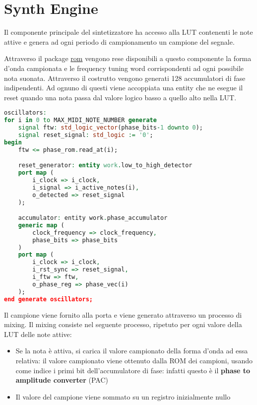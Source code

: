\section{Synth Engine}
\label{sec:synthengine}

\begin{center}
\end{center}


Il componente principale del sintetizzatore ha accesso alla LUT contenenti le note attive e genera ad ogni periodo di campionamento
un campione del segnale.

Attraverso il package \hyperref[sec:rom]{rom} vengono rese disponibili a questo componente la forma d'onda campionata e le frequency
tuning word corrispondenti ad ogni possibile nota suonata.
Attraverso il costrutto  vengono generati 128 accumulatori di fase indipendenti. Ad ognuno di questi viene accoppiata
una entity che ne esegue il reset quando una nota passa dal valore logico basso a quello alto nella LUT.
\begin{lstlisting}[language=VHDL]
oscillators:
for i in 0 to MAX_MIDI_NOTE_NUMBER generate
    signal ftw: std_logic_vector(phase_bits-1 downto 0);
    signal reset_signal: std_logic := '0';
begin
    ftw <= phase_rom.read_at(i);

    reset_generator: entity work.low_to_high_detector
    port map (
        i_clock => i_clock,
        i_signal => i_active_notes(i),
        o_detected => reset_signal
    );

    accumulator: entity work.phase_accumulator
    generic map (
        clock_frequency => clock_frequency,
        phase_bits => phase_bits
    )
    port map (
        i_clock => i_clock,
        i_rst_sync => reset_signal,
        i_ftw => ftw,
        o_phase_reg => phase_vec(i)
    );
end generate oscillators;
\end{lstlisting}

Il campione viene fornito alla porta  e viene generato attraverso un processo di mixing.
Il mixing consiste nel seguente processo, ripetuto per ogni valore della LUT delle note attive:
\begin{itemize}
    \item Se la nota è attiva, si carica il valore campionato della forma d'onda ad essa relativa:
          il valore campionato viene ottenuto dalla ROM dei campioni, usando come indice
          i primi  bit dell'accumulatore di fase: infatti questo è il
          \textbf{phase to amplitude converter} (PAC)
    \item Il valore del campione viene sommato su un registro inizialmente nullo
\end{itemize} 

